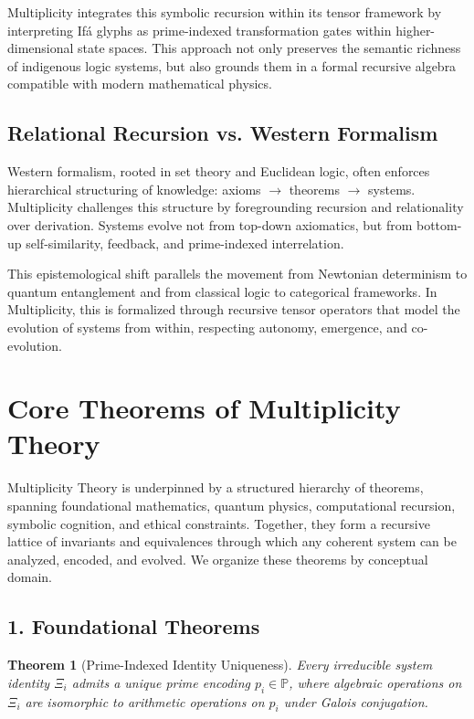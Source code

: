 \documentclass{article}
\theoremstyle{plain}
\newtheorem{theorem}{Theorem}
\begin{document}
Multiplicity integrates this symbolic recursion within its tensor framework by interpreting Ifá glyphs as prime-indexed transformation gates within higher-dimensional state spaces. This approach not only preserves the semantic richness of indigenous logic systems, but also grounds them in a formal recursive algebra compatible with modern mathematical physics.

\subsection{Relational Recursion vs. Western Formalism}

Western formalism, rooted in set theory and Euclidean logic, often enforces hierarchical structuring of knowledge: axioms \(\rightarrow\) theorems \(\rightarrow\) systems. Multiplicity challenges this structure by foregrounding recursion and relationality over derivation. Systems evolve not from top-down axiomatics, but from bottom-up self-similarity, feedback, and prime-indexed interrelation.

This epistemological shift parallels the movement from Newtonian determinism to quantum entanglement and from classical logic to categorical frameworks. In Multiplicity, this is formalized through recursive tensor operators that model the evolution of systems from within, respecting autonomy, emergence, and co-evolution.



\section{Core Theorems of Multiplicity Theory}

Multiplicity Theory is underpinned by a structured hierarchy of theorems, spanning foundational mathematics, quantum physics, computational recursion, symbolic cognition, and ethical constraints. Together, they form a recursive lattice of invariants and equivalences through which any coherent system can be analyzed, encoded, and evolved. We organize these theorems by conceptual domain.

\subsection{1. Foundational Theorems}

\begin{theorem}[Prime-Indexed Identity Uniqueness]
Every irreducible system identity \( \Xi_i \) admits a unique prime encoding \( p_i \in \mathbb{P} \), where algebraic operations on \( \Xi_i \) are isomorphic to arithmetic operations on \( p_i \) under Galois conjugation.
\end{theorem}
\end{document}

